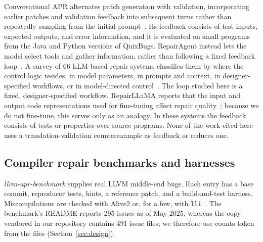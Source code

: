 \documentclass[conference]{IEEEtran}
\begin{document}
Conversational APR alternates patch generation with validation, incorporating earlier patches and validation feedback into subsequent turns rather than repeatedly sampling from the initial prompt~\cite{xia2023conversational}. Its feedback consists of test inputs, expected outputs, and error information, and it is evaluated on small programs from the Java and Python versions of QuixBugs. RepairAgent instead lets the model select tools and gather information, rather than following a fixed feedback loop~\cite{bouzenia2025repairagent}. A survey of 66 LLM-based repair systems classifies them by where the control logic resides: in model parameters, in prompts and context, in designer-specified workflows, or in model-directed control~\cite{yang2026survey}. The loop studied here is a fixed, designer-specified workflow. RepairLLaMA reports that the input and output code representations used for fine-tuning affect repair quality~\cite{silva2025repairllama}; because we do not fine-tune, this serves only as an analogy. In these systems the feedback consists of tests or properties over source programs. None of the work cited here uses a translation-validation counterexample as feedback or reduces one.

\subsection{Compiler repair benchmarks and harnesses}

\emph{llvm-apr-benchmark} supplies real LLVM middle-end bugs. Each entry has a base commit, reproducer tests, hints, a reference patch, and a build-and-test harness. Miscompilations are checked with Alive2 or, for a few, with \texttt{lli}~\cite{zheng2025aprbench}. The benchmark's README reports 295 issues as of May 2025, whereas the copy vendored in our repository contains 491 issue files; we therefore use counts taken from the files (Section~\ref{sec:design}).
\end{document}
